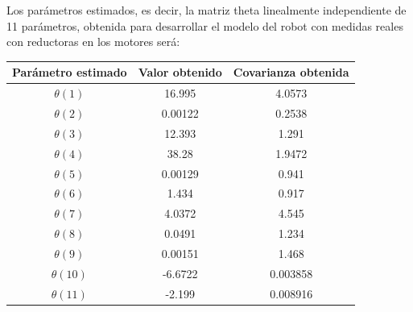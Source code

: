 Los parámetros estimados, es decir, la matriz theta linealmente independiente de 11 parámetros, obtenida para desarrollar el modelo del robot con medidas reales con reductoras en los motores será:

\begin{center}

	\begin{tabular}{| c | c | c |}



		\hline

		Parámetro estimado & Valor obtenido & Covarianza obtenida \\

		\hline

		$\theta(1) $ & 16.995 & 4.0573 \\

		\hline

		$\theta(2) $ & 0.00122 & 0.2538 \\

		\hline

		$\theta(3) $ & 12.393 & 1.291 \\

		\hline

		$\theta(4) $ & 38.28 & 1.9472 \\

		\hline

		$\theta(5) $ & 0.00129 & 0.941 \\

		\hline

		$\theta(6) $ & 1.434 & 0.917 \\

		\hline

		$\theta(7) $ & 4.0372 & 4.545 \\

		\hline

		$\theta(8) $ & 0.0491 & 1.234 \\

		\hline

		$\theta(9) $ & 0.00151 & 1.468 \\

		\hline

		$\theta(10) $ & -6.6722 & 0.003858 \\

		\hline

		$\theta(11) $ & -2.199 & 0.008916 \\

		\hline

	\end{tabular}

\end{center}

